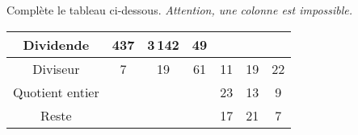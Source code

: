 Complète le tableau ci-dessous. {\em Attention, une colonne est impossible.}
\begin{center}
  \begin{tabular}{|c|c|c|c|c|c|c|}
    \hline
    Dividende&437&3\,142&49&&&\\
    \hline
    Diviseur&7&19&61&11&19&22\\
    \hline
    Quotient entier&&&&23&13&9\\
    \hline
    Reste&&&&17&21&7\\
    \hline
  \end{tabular}
\end{center}